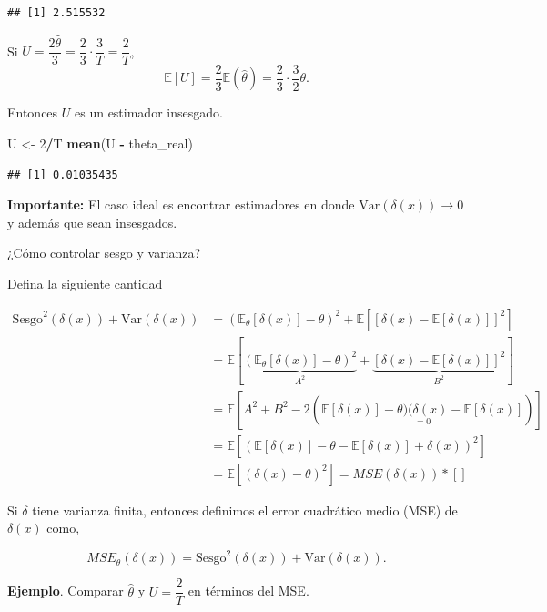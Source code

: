 \documentclass[
  12pt,
]{book}
\newenvironment{Shaded}{\begin{snugshade}}{\end{snugshade}}
\newcommand{\DecValTok}[1]{\textcolor[rgb]{0.00,0.00,0.81}{#1}}
\newcommand{\KeywordTok}[1]{\textcolor[rgb]{0.13,0.29,0.53}{\textbf{#1}}}
\newcommand{\NormalTok}[1]{#1}
\newcommand{\OperatorTok}[1]{\textcolor[rgb]{0.81,0.36,0.00}{\textbf{#1}}}
\newcommand{\StringTok}[1]{\textcolor[rgb]{0.31,0.60,0.02}{#1}}
\begin{document}
\begin{verbatim}
## [1] 2.515532
\end{verbatim}

Si \(U = \dfrac {2\hat\theta}{3} = \dfrac 23 \cdot \dfrac{3}{T} = \dfrac 2T\),
\[\mathbb E[U] = \dfrac 23 \mathbb E(\hat\theta) =\dfrac 23 \cdot \dfrac 32 \theta.\]

Entonces \(U\) es un estimador insesgado.

\begin{Shaded}
\begin{Highlighting}[]
\NormalTok{U \textless{}{-}}\StringTok{ }\DecValTok{2}\OperatorTok{/}\NormalTok{T}
\KeywordTok{mean}\NormalTok{(U }\OperatorTok{{-}}\StringTok{ }\NormalTok{theta\_real)}
\end{Highlighting}
\end{Shaded}

\begin{verbatim}
## [1] 0.01035435
\end{verbatim}

\textbf{Importante:} El caso ideal es encontrar estimadores en donde
\(\text{Var}(\delta(x))\to 0\) y además que sean insesgados.

¿Cómo controlar sesgo y varianza?

Defina la siguiente cantidad

\begin{align*}
\text{Sesgo}^2(\delta(x))+\text{Var}(\delta(x)) & = (\mathbb E_\theta[\delta(x)]-\theta)^2 + \mathbb E[[\delta(x)-\mathbb E[\delta(x)]]^2]\\
	& =\mathbb E[ \underbrace{(\mathbb E_\theta[\delta(x)]-\theta)^2}_{A^2} + \underbrace{[\delta(x)-\mathbb E[\delta(x)]]^2}_{B^2}]\\
	& = \mathbb E[A^2+B^2 - 2(\underset{=0}{\mathbb E[\delta(x)]-\theta)(\delta(x)-\mathbb E[\delta(x)]})]\\
	& =  \mathbb E[(\mathbb E[\delta(x)]-\theta - \mathbb E[\delta(x)] + \delta(x))^2]\\
	& = \mathbb E[(\delta(x)-\theta)^2] = MSE(\delta(x))
  * [ ] \end{align*}

Si \(\delta\) tiene varianza finita, entonces definimos el error cuadrático medio
(MSE) de \(\delta(x)\) como,

\[MSE_{\theta}(\delta(x)) =\text{Sesgo}^2(\delta(x)) + \text{Var}(\delta(x)).\]

\textbf{Ejemplo}. Comparar \(\hat\theta\) y \(U =\dfrac 2T\) en términos del MSE.
\end{document}
